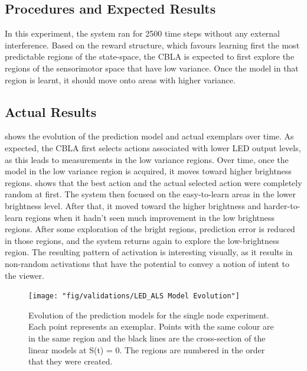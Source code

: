 \subsection{Procedures and Expected Results}
In this experiment, the system ran for 2500 time steps without any external interference. 
Based on the reward structure, which favours learning first the most predictable regions of the state-space, the CBLA is expected to first explore the regions of the sensorimotor space that have low variance. Once the model in that region is learnt, it should move onto areas with higher variance.

\subsection{Actual Results}

 shows the evolution of the prediction model and actual exemplars over time. As expected, the CBLA first selects actions associated with lower LED output levels, as this leads to measurements in the low variance regions. Over time, once the model in the low variance region is acquired, it moves toward higher brightness regions.  shows that the best action and the actual selected action were completely random at first. The system then focused on the easy-to-learn areas in the lower brightness level. After that, it moved toward the higher brightness and harder-to-learn regions when it hadn't seen much improvement in the low brightness regions. After some exploration of the bright regions, prediction error is reduced in those regions, and the system returns again to explore the low-brightness region.  The resulting pattern of activation is interesting visually, as it results in non-random activations that have the potential to convey a notion of intent to the viewer. 
 
\begin{figure} [!htbp]
	\centering
	\texttt{[image: "fig/validations/LED\_ALS Model Evolution"]}
	\caption[Evolution of the prediction models for the single node experiment]{Evolution of the prediction models for the single node experiment. Each point represents an exemplar. Points with the same colour are in the same region and the black lines are the cross-section of the linear models at S(t) = 0. The regions are numbered in the order that they were created. }
	\label{fig:LED_ALS Model Evolution}
\end{figure}

